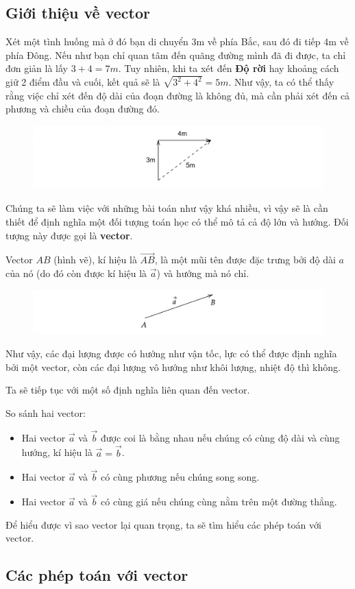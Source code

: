 \subsection{Giới thiệu về vector}
Xét một tình huống mà ở đó bạn di chuyển 3m về phía Bắc, sau đó đi tiếp 4m về phía Đông. Nếu như bạn chỉ quan tâm đến quãng đường mình đã đi được, ta chỉ đơn giản là lấy \(3+4=7\si{m}\). Tuy nhiên, khi ta xét đến \textbf{Độ rời} hay khoảng cách giữ 2 điểm đầu và cuối, kết quả sẽ là \(\sqrt{3^2+4^2}=5\si{m}\). Như vậy, ta có thể thấy rằng việc chỉ xét đến độ dài của đoạn đường là không đủ, mà cần phải xét đến cả phương và chiều của đoạn đường đó.
\begin{figure}[H]
\centering
\includegraphics[width=1\textwidth]{Tuan2/Figures/gioithieuvector.png}
\end{figure}
Chúng ta sẽ làm việc với những bài toán như vậy khá nhiều, vì vậy sẽ là cần thiết để định nghĩa một đối tượng toán học có thể mô tả cả độ lớn và hướng. Đối tượng này được gọi là \textbf{vector}.
\begin{definition} Vector \(AB\) (hình vẽ), kí hiệu là \(\overrightarrow{AB}\), là một mũi tên được đặc trưng bởi độ dài \(a\) của nó (do đó còn được kí hiệu là \(\overrightarrow{a}\)) và hướng mà nó chỉ.
\end{definition}
\begin{figure}[H]
\centering
\includegraphics[width=1\textwidth]{Tuan2/Figures/vectorAB.png}
\end{figure}
Như vậy, các đại lượng được có hướng như vận tốc, lực có thể được định nghĩa bởi một vector, còn các đại lượng vô hướng như khôi lượng, nhiệt độ thì không.

Ta sẽ tiếp tục với một số định nghĩa liên quan đến vector.
\begin{definition}
    So sánh hai vector:
    \begin{itemize}
        \item Hai vector \(\overrightarrow{a}\) và \(\overrightarrow{b}\) được coi là bằng nhau nếu chúng có cùng độ dài và cùng hướng, kí hiệu là \(\overrightarrow{a}=\overrightarrow{b}\).
        \item Hai vector \(\overrightarrow{a}\) và \(\overrightarrow{b}\) có cùng phương nếu chúng song song.
        \item Hai vector \(\overrightarrow{a}\) và \(\overrightarrow{b}\) có cùng giá nếu chúng cùng nằm trên một đường thẳng.
    \end{itemize}
\end{definition}
Để hiểu được vì sao vector lại quan trọng, ta sẽ tìm hiểu các phép toán với vector.

\subsection{Các phép toán với vector}



